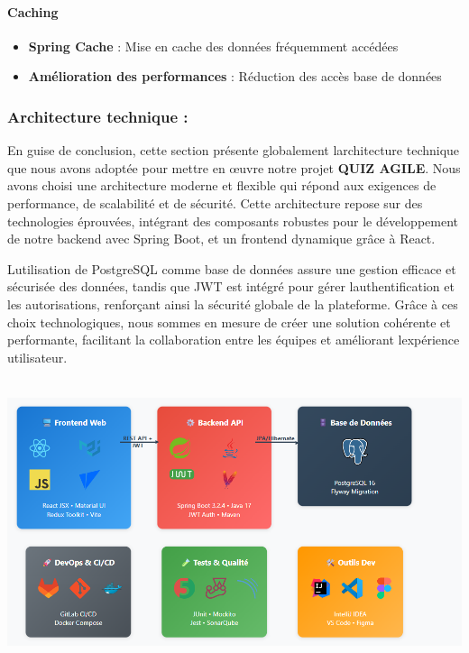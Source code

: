 \documentclass[12pt,a4paper,twoside]{report}
\begin{document}
\hypertarget{caching}{%
\paragraph{Caching}\label{caching}}

\begin{itemize}
\item
  \textbf{Spring Cache} : Mise en cache des données fréquemment accédées
\item
  \textbf{Amélioration des performances} : Réduction des accès base de
  données
\end{itemize}

\hypertarget{architecture-technique}{%
\subsubsection{Architecture technique :}\label{architecture-technique}}

En guise de conclusion, cette section présente globalement
l\textquotesingle architecture technique que nous avons adoptée pour
mettre en œuvre notre projet \textbf{QUIZ AGILE}. Nous avons choisi une
architecture moderne et flexible qui répond aux exigences de
performance, de scalabilité et de sécurité. Cette architecture repose
sur des technologies éprouvées, intégrant des composants robustes pour
le développement de notre backend avec Spring Boot, et un frontend
dynamique grâce à React.

L\textquotesingle utilisation de PostgreSQL comme base de données assure
une gestion efficace et sécurisée des données, tandis que JWT est
intégré pour gérer l\textquotesingle authentification et les
autorisations, renforçant ainsi la sécurité globale de la plateforme.
Grâce à ces choix technologiques, nous sommes en mesure de créer une
solution cohérente et performante, facilitant la collaboration entre les
équipes et améliorant l\textquotesingle expérience utilisateur.

\includegraphics[width=6.03941in,height=3.29328in]{latex_media/media/image44.png}
\end{document}
